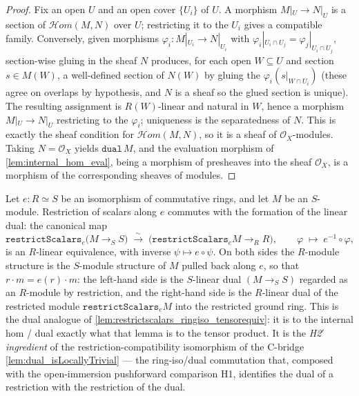 \begin{proof}
  \leanok
  Fix an open \(U\) and an open cover \(\{U_i\}\) of \(U\). A morphism
  \(M|_U \to N|_U\) is a section of \(\mathcal{H}om(M, N)\) over \(U\); restricting it
  to the \(U_i\) gives a compatible family. Conversely, given morphisms
  \(\varphi_i : M|_{U_i} \to N|_{U_i}\) with \(\varphi_i|_{U_i \cap U_j} =
  \varphi_j|_{U_i \cap U_j}\), section-wise gluing in the sheaf \(N\) produces, for
  each open \(W \subseteq U\) and section \(s \in M(W)\), a well-defined section of
  \(N(W)\) by gluing the \(\varphi_i(s|_{W \cap U_i})\) (these agree on overlaps by
  hypothesis, and \(N\) is a sheaf so the glued section is unique). The resulting
  assignment is \(R(W)\)-linear and natural in \(W\), hence a morphism
  \(M|_U \to N|_U\) restricting to the \(\varphi_i\); uniqueness is the separatedness
  of \(N\). This is exactly the sheaf condition for \(\mathcal{H}om(M, N)\), so it is a
  sheaf of \(\mathcal{O}_X\)-modules. Taking \(N = \mathcal{O}_X\) yields
  \(\mathtt{dual}\,M\), and the evaluation morphism of \cref{lem:internal_hom_eval},
  being a morphism of presheaves into the sheaf \(\mathcal{O}_X\), is a morphism of
  the corresponding sheaves of modules.
\end{proof}

\begin{lemma}

  \label{lem:restrictscalars_ringiso_dualequiv}
  Let \(e : R \simeq S\) be an isomorphism of commutative rings, and let \(M\) be an
  \(S\)-module. Restriction of scalars along \(e\) commutes with the formation of the
  linear dual: the canonical map
  \[
    \mathtt{restrictScalars}_e\bigl(M \to_S S\bigr)
      \;\xrightarrow{\ \sim\ }\;
    \bigl(\mathtt{restrictScalars}_e M \to_R R\bigr),
    \qquad \varphi \;\longmapsto\; e^{-1} \circ \varphi,
  \]
  is an \(R\)-linear equivalence, with inverse \(\psi \mapsto e \circ \psi\). On both
  sides the \(R\)-module structure is the \(S\)-module structure of \(M\) pulled back
  along \(e\), so that \(r \cdot m = e(r) \cdot m\): the left-hand side is the
  \(S\)-linear dual \((M \to_S S)\) regarded as an \(R\)-module by restriction, and the
  right-hand side is the \(R\)-linear dual of the restricted module
  \(\mathtt{restrictScalars}_e M\) into the restricted ground ring. This is the dual
  analogue of \cref{lem:restrictscalars_ringiso_tensorequiv}: it is to the internal hom
  / dual exactly what that lemma is to the tensor product. It is the \emph{H2$'$
  ingredient} of the restriction-compatibility isomorphism of the C-bridge
  \cref{lem:dual_isLocallyTrivial} --- the ring-iso/dual commutation that, composed with
  the open-immersion pushforward comparison H1, identifies the dual of a restriction
  with the restriction of the dual.
\end{lemma}

